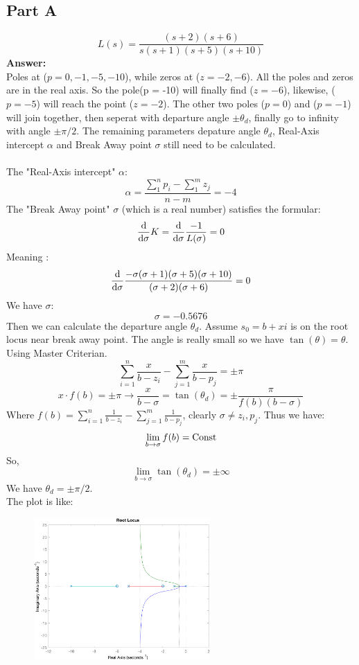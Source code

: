 \documentclass[a4paper]{article}
\begin{document}
\subsection{Part A} 
$$L(s) = \frac{(s+2)(s+6)}{s(s+1)(s+5)(s+10)}$$
{\bf Answer:}\\
Poles at ($p = 0, -1, -5, -10$), while zeros at ($z = -2, -6$). All the poles and zeros are in the real axis. So the pole(p = -10) will finally find ($z = -6$), likewise, ($p = -5$) will reach the point ($z = -2$). The other two poles ($p = 0$) and ($p = -1$) will join together, then seperat with departure angle $\pm \theta_d$, finally go to infinity with angle $\pm \pi/2$. The remaining parameters depature angle $\theta_d$, Real-Axis intercept $\alpha$ and Break Away point $\sigma$ still need to be calculated.\\
\\
The "Real-Axis intercept" $\alpha$:
$$
\alpha = \frac{\sum_{1}^{n}p_i-\sum_1^m z_j}{n-m} = -4
$$
The "Break Away point" $\sigma$ (which is a real number) satisfies the formular:
$$
\frac{\rm d}{{\rm d}\sigma}K  = \frac{{\rm d}}{{\rm d}\sigma}\frac {-1} {L(\sigma)} = 0
$$
Meaning :
$$
\frac{\rm d}{{\rm d}\sigma}\frac{-\sigma(\sigma+1)(\sigma+5)(\sigma+10)}{(\sigma+2)(\sigma+6)} = 0
$$
We have $\sigma$:
$$
\sigma = -0.5676
$$
Then we can calculate the departure angle $\theta_d$. Assume $s_0 = b+xi$ is on the root locus near break away point. The angle is really small so we have $\tan(\theta) = \theta$. Using Master Criterian.
$$
\sum_{i=1}^n \frac{x}{b - z_i} - \sum_{j=1}^m \frac{x}{b - p_j} = \pm\pi
$$
$$
x\cdot f(b) = \pm\pi\rightarrow \frac{x}{b-\sigma} = \tan(\theta_d) = \pm \frac{\pi}{f(b)(b - \sigma)}
$$
Where $f(b) = \sum_{i=1}^n \frac{1}{b - z_i} - \sum_{j=1}^m \frac{1}{b - p_j}$, clearly $\sigma \neq z_i,p_j$. Thus we have:
$$
\lim_{b\rightarrow\sigma}f(b) = \rm Const
$$
So, 
$$
\lim_{b\rightarrow\sigma}\tan(\theta_d) = \pm\infty
$$
We have $\theta_d = \pm\pi/2$.\\
The plot is like:
\begin{figure}[H]
\centering
\includegraphics[width = 0.6\textwidth]{pic/t1.png}
\end{figure}
\end{document}
